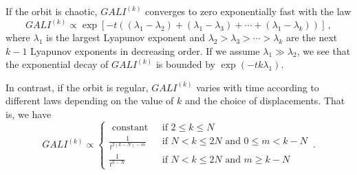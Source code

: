 If the orbit is chaotic, $GALI^{(k)}$ converges to zero exponentially fast with the law
\begin{equation}
    GALI^{(k)} \propto \exp\left[-t\left((\lambda_1 - \lambda_2)+(\lambda_1 - \lambda_3)+\cdots+(\lambda_1 - \lambda_k)\right)\right] \,,
\end{equation}
where $\lambda_1$ is the largest Lyapunov exponent and $\lambda_2> \lambda_3>\cdots>\lambda_k$ are the next $k-1$ Lyapunov exponents in decreasing order. If we assume $\lambda_1 \gg \lambda_2$, we see that the exponential decay of $GALI^{(k)}$ is bounded by $\exp(-tk\lambda_1)$.

In contrast, if the orbit is regular, $GALI^{(k)}$ varies with time according to different laws depending on the value of $k$ and the choice of displacements. That is, we have
\begin{equation}
    GALI^{(k)} \propto \begin{cases}\text { constant } & \text { if } 2 \leq k \leq N \\ \frac{1}{t^{2(k-N)-m}} & \text { if } N<k \leq 2 N \text { and } 0 \leq m<k-N \\ \frac{1}{t^{k-N}} & \text { if } N<k \leq 2 N \text { and } m \geq k-N\end{cases} \,.
\end{equation}

